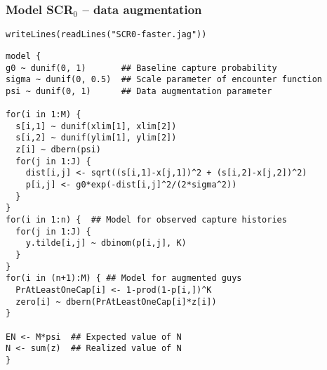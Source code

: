 \documentclass[color=usenames,dvipsnames]{beamer}\usepackage[]{graphicx}\usepackage[]{color}
\makeatletter
\newcommand{\hlstr}[1]{\textcolor[rgb]{0.749,0.012,0.012}{#1}}%
\newcommand{\hlstd}[1]{\textcolor[rgb]{0,0,0}{#1}}%
\newcommand{\hlkwd}[1]{\textcolor[rgb]{0.004,0.004,0.506}{#1}}%
\newenvironment{kframe}{%
 \def\at@end@of@kframe{}%
 \ifinner\ifhmode%
  \def\at@end@of@kframe{\end{minipage}}%
  \begin{minipage}{\columnwidth}%
 \fi\fi%
 \def\FrameCommand##1{\hskip\@totalleftmargin \hskip-\fboxsep
 \colorbox{shadecolor}{##1}\hskip-\fboxsep
     \hskip-\linewidth \hskip-\@totalleftmargin \hskip\columnwidth}%
 \MakeFramed {\advance\hsize-\width
   \@totalleftmargin\z@ \linewidth\hsize
   \@setminipage}}%
 {\par\unskip\endMakeFramed%
 \at@end@of@kframe}
\newenvironment{knitrout}{}{} %
\makeatother
\begin{document}
\begin{frame}[fragile]
  \frametitle{Model SCR$_0$ -- data augmentation}
\vspace{-3pt}
\begin{knitrout}\tiny
{}\color{fgcolor}\begin{kframe}
\begin{alltt}
\hlkwd{writeLines}\hlstd{(}\hlkwd{readLines}\hlstd{(}\hlstr{"SCR0-faster.jag"}\hlstd{))}
\end{alltt}
\end{kframe}
\end{knitrout}
\begin{knitrout}\tiny
{}\color{fgcolor}\begin{kframe}
\begin{verbatim}
model {
g0 ~ dunif(0, 1)       ## Baseline capture probability
sigma ~ dunif(0, 0.5)  ## Scale parameter of encounter function
psi ~ dunif(0, 1)      ## Data augmentation parameter

for(i in 1:M) {
  s[i,1] ~ dunif(xlim[1], xlim[2])
  s[i,2] ~ dunif(ylim[1], ylim[2])
  z[i] ~ dbern(psi)
  for(j in 1:J) {
    dist[i,j] <- sqrt((s[i,1]-x[j,1])^2 + (s[i,2]-x[j,2])^2)
    p[i,j] <- g0*exp(-dist[i,j]^2/(2*sigma^2))
  }
}
for(i in 1:n) {  ## Model for observed capture histories
  for(j in 1:J) {
    y.tilde[i,j] ~ dbinom(p[i,j], K)
  }
}
for(i in (n+1):M) { ## Model for augmented guys
  PrAtLeastOneCap[i] <- 1-prod(1-p[i,])^K
  zero[i] ~ dbern(PrAtLeastOneCap[i]*z[i])
}

EN <- M*psi  ## Expected value of N
N <- sum(z)  ## Realized value of N
}
\end{verbatim}
\end{kframe}
\end{knitrout}
\end{frame}
\end{document}
